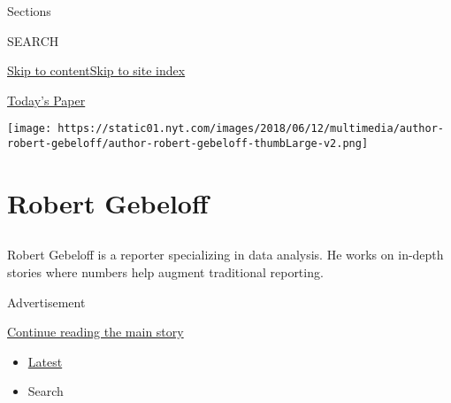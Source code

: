 Sections

SEARCH

\protect\hyperlink{site-content}{Skip to
content}\protect\hyperlink{site-index}{Skip to site index}

\href{https://myaccount.nytimes.com/auth/login?response_type=cookie\&client_id=vi}{}

\href{https://www.nytimes.com/section/todayspaper}{Today's Paper}

\texttt{[image: https://static01.nyt.com/images/2018/06/12/multimedia/author-robert-gebeloff/author-robert-gebeloff-thumbLarge-v2.png]}

\hypertarget{robert-gebeloff}{%
\section{Robert Gebeloff}\label{robert-gebeloff}}

\subsection{}

Robert Gebeloff is a reporter specializing in data analysis. He works on
in-depth stories where numbers help augment traditional reporting.

Advertisement

\protect\hyperlink{after-mid1}{Continue reading the main story}

\begin{itemize}
\tightlist
\item
  \protect\hyperlink{stream-panel}{Latest}
\item
  Search
\end{itemize}

